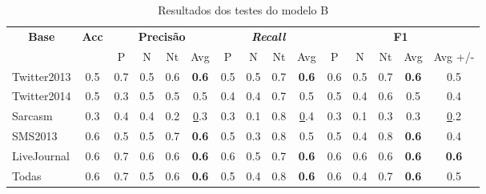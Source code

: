 \documentclass[12pt]{article}
\begin{document}
\begin{table}[H]
\centering
\begin{adjustwidth}{-1cm}{}
\begin{tabular}{lcccccccccccccc}
\multicolumn{1}{c}{\textbf{Base}} & \textbf{Acc} & \multicolumn{4}{c}{\textbf{Precisão}} & \multicolumn{4}{c}{\textit{\textbf{Recall}}} & \multicolumn{5}{c}{\textbf{F1}} \\
 &  & \multicolumn{1}{c|}{P} & \multicolumn{1}{c|}{N} & \multicolumn{1}{c|}{Nt} & Avg & \multicolumn{1}{c|}{P} & \multicolumn{1}{c|}{N} & \multicolumn{1}{c|}{Nt} & Avg & \multicolumn{1}{c|}{P} & \multicolumn{1}{c|}{N} & \multicolumn{1}{c|}{Nt} & \multicolumn{1}{c|}{Avg} & Avg +/- \\
Twitter2013 & 0.5 & 0.7 & 0.5 & 0.6 & \textbf{0.6} & 0.5 & 0.5 & 0.7 & \textbf{0.6} & 0.6 & 0.5 & 0.7 & \textbf{0.6} & 0.5 \\ \hline
Twitter2014 & 0.5 & 0.3 & 0.5 & 0.5 & 0.5 & 0.4 & 0.4 & 0.7 & 0.5 & 0.5 & 0.4 & 0.6 & 0.5 & 0.4 \\ \hline
Sarcasm & 0.3 & 0.4 & 0.4 & 0.2 & {\ul 0.3} & 0.3 & 0.1 & 0.8 & {\ul 0.4} & 0.3 & 0.1 & 0.3 & 0.3 & {\ul 0.2} \\ \hline
SMS2013 & 0.6 & 0.5 & 0.5 & 0.7 & \textbf{0.6} & 0.5 & 0.3 & 0.8 & 0.5 & 0.5 & 0.4 & 0.8 & \textbf{0.6} & 0.4 \\ \hline
LiveJournal & 0.6 & 0.7 & 0.6 & 0.6 & \textbf{0.6} & 0.6 & 0.5 & 0.7 & \textbf{0.6} & 0.6 & 0.6 & 0.6 & \textbf{0.6} & \textbf{0.6} \\ \hline
Todas & 0.6 & 0.7 & 0.5 & 0.6 & \textbf{0.6} & 0.5 & 0.4 & 0.8 & \textbf{0.6} & 0.6 & 0.4 & 0.7 & \textbf{0.6} & 0.5 \\ \hline
\end{tabular}
\caption{Resultados dos testes do modelo B}
\label{test2}
\end{adjustwidth}
\end{table}
\end{document}
